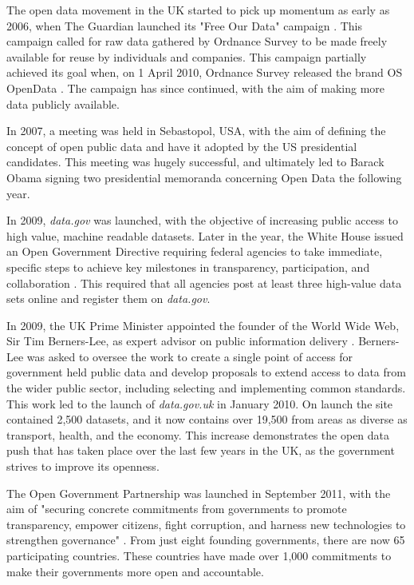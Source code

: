 \documentclass[authoryearcitations]{UoYCSproject}
\begin{document}
The open data movement in the UK started to pick up momentum as early as 2006, when The Guardian launched its "Free Our Data" campaign \citep{GuardianTechnology2006}. This campaign called for raw data gathered by Ordnance Survey to be made freely available for reuse by individuals and companies. This campaign partially achieved its goal when, on 1 April 2010, Ordnance Survey released the brand OS OpenData \citep{OrdnanceSurveyteam2010}. The campaign has since continued, with the aim of making more data publicly available. 

In 2007, a meeting was held in Sebastopol, USA, with the aim of defining the concept of open public data and have it adopted by the US presidential candidates. This meeting was hugely successful, and ultimately led to Barack Obama signing two presidential memoranda concerning Open Data the following year. 

In 2009, \textit{data.gov} was launched, with the objective of increasing public access to high value, machine readable datasets. Later in the year, the White House issued an Open Government Directive requiring federal agencies to take immediate, specific steps to achieve key milestones in transparency, participation, and collaboration \citep{Orszag2009}. This required that all agencies post at least three high-value data sets online and register them on \textit{data.gov}.

In 2009, the UK Prime Minister appointed the founder of the World Wide Web, Sir Tim Berners-Lee, as expert advisor on public information delivery \citep{CabinetOffice2009}. Berners-Lee was asked to oversee the work to create a single point of access for government held public data and develop proposals to extend access to data from the wider public sector, including selecting and implementing common standards. This work led to the launch of \textit{data.gov.uk} in January 2010. On launch the site contained 2,500 datasets, and it now contains over 19,500 from areas as diverse as transport, health, and the economy. This increase demonstrates the open data push that has taken place over the last few years in the UK, as the government strives to improve its openness.

The Open Government Partnership was launched in September 2011, with the aim of "securing concrete commitments from governments to promote transparency, empower citizens, fight corruption, and harness new technologies to strengthen governance" \citep{OpenGovernmentPartnership}. From just eight founding governments, there are now 65 participating countries. These countries have made over 1,000 commitments to make their governments more open and accountable.
\end{document}
